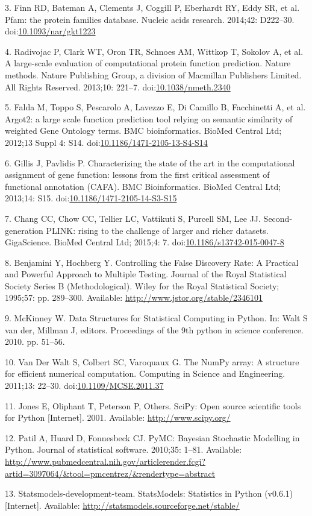 \documentclass[letterpaper]{scrartcl}
\begin{document}
3. Finn RD, Bateman A, Clements J, Coggill P, Eberhardt RY, Eddy SR, et
al. Pfam: the protein families database. Nucleic acids research.
2014;42: D222--30.
doi:\href{http://dx.doi.org/10.1093/nar/gkt1223}{10.1093/nar/gkt1223}

4. Radivojac P, Clark WT, Oron TR, Schnoes AM, Wittkop T, Sokolov A, et
al. A large-scale evaluation of computational protein function
prediction. Nature methods. Nature Publishing Group, a division of
Macmillan Publishers Limited. All Rights Reserved. 2013;10: 221--7.
doi:\href{http://dx.doi.org/10.1038/nmeth.2340}{10.1038/nmeth.2340}

5. Falda M, Toppo S, Pescarolo A, Lavezzo E, {Di Camillo} B, Facchinetti
A, et al. Argot2: a large scale function prediction tool relying on
semantic similarity of weighted Gene Ontology terms. BMC bioinformatics.
BioMed Central Ltd; 2012;13 Suppl 4: S14.
doi:\href{http://dx.doi.org/10.1186/1471-2105-13-S4-S14}{10.1186/1471-2105-13-S4-S14}

6. Gillis J, Pavlidis P. Characterizing the state of the art in the
computational assignment of gene function: lessons from the first
critical assessment of functional annotation (CAFA). BMC Bioinformatics.
BioMed Central Ltd; 2013;14: S15.
doi:\href{http://dx.doi.org/10.1186/1471-2105-14-S3-S15}{10.1186/1471-2105-14-S3-S15}

7. Chang CC, Chow CC, Tellier LC, Vattikuti S, Purcell SM, Lee JJ.
Second-generation PLINK: rising to the challenge of larger and richer
datasets. GigaScience. BioMed Central Ltd; 2015;4: 7.
doi:\href{http://dx.doi.org/10.1186/s13742-015-0047-8}{10.1186/s13742-015-0047-8}

8. Benjamini Y, Hochberg Y. Controlling the False Discovery Rate: A
Practical and Powerful Approach to Multiple Testing. Journal of the
Royal Statistical Society Series B (Methodological). Wiley for the Royal
Statistical Society; 1995;57: pp. 289--300. Available:
\url{http://www.jstor.org/stable/2346101}

9. McKinney W. Data Structures for Statistical Computing in Python. In:
Walt S van der, Millman J, editors. Proceedings of the 9th python in
science conference. 2010. pp. 51--56.

10. {Van Der Walt} S, Colbert SC, Varoquaux G. The NumPy array: A
structure for efficient numerical computation. Computing in Science and
Engineering. 2011;13: 22--30.
doi:\href{http://dx.doi.org/10.1109/MCSE.2011.37}{10.1109/MCSE.2011.37}

11. Jones E, Oliphant T, Peterson P, Others. SciPy: Open source
scientific tools for Python {[}Internet{]}. 2001. Available:
\url{http://www.scipy.org/}

12. Patil A, Huard D, Fonnesbeck CJ. PyMC: Bayesian Stochastic Modelling
in Python. Journal of statistical software. 2010;35: 1--81. Available:
\url{http://www.pubmedcentral.nih.gov/articlerender.fcgi?artid=3097064/\&tool=pmcentrez/\&rendertype=abstract}

13. Statsmodels-development-team. StatsModels: Statistics in Python
(v0.6.1) {[}Internet{]}. Available:
\url{http://statsmodels.sourceforge.net/stable/}
\end{document}
